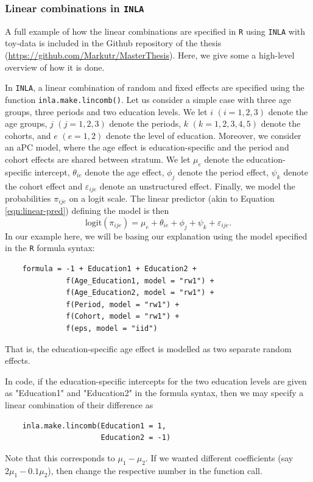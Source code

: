 \FloatBarrier
\subsubsection{Linear combinations in \texttt{INLA}}
\label{appendix:implementation:lincombs}
A full example of how the linear combinations are specified in \texttt{R} using \texttt{INLA} with toy-data is included in the Github repository of the thesis (\url{https://github.com/Markutr/MasterThesis}). Here, we give some a high-level overview of how it is done.

In \texttt{INLA}, a linear combination of random and fixed effects are specified using the function \texttt{inla.make.lincomb()}. Let us consider a simple case with three age groups, three periods and two education levels. We let $i$ $(i= 1,2,3)$ denote the age groups, $j$ $(j= 1,2,3)$ denote the periods, $k$ $(k= 1,2,3,4,5)$ denote the cohorts, and $e$ $(e= 1,2)$ denote the level of education. Moreover, we consider an aPC model, where the age effect is education-specific and the period and cohort effects are shared between stratum. We let $\mu_e$ denote the education-specific intercept, $\theta_{ie}$ denote the age effect, $\phi_j$ denote the period effect, $\psi_k$ denote the cohort effect and $\varepsilon_{ije}$ denote an unstructured effect. Finally, we model the probabilities $\pi_{ije}$ on a logit scale. The linear predictor (akin to Equation \eqref{eqn:linear-pred}) defining the model is then
\begin{equation}
    \text{logit}(\pi_{ije}) = \mu_e + \theta_{ie} + \phi_j + \psi_k + \varepsilon_{ije}.
\end{equation}
In our example here, we will be basing our explanation using the model specified in the \texttt{R} formula syntax:
\begin{lstlisting}
    formula = -1 + Education1 + Education2 + 
              f(Age_Education1, model = "rw1") + 
              f(Age_Education2, model = "rw1") +
              f(Period, model = "rw1") +
              f(Cohort, model = "rw1") +
              f(eps, model = "iid")
\end{lstlisting}
That is, the education-specific age effect is modelled as two separate random effects. 

In code, if the education-specific intercepts for the two education levels are given as "Education1" and "Education2" in the formula syntax, then we may specify a linear combination of their difference as
\begin{lstlisting}
    inla.make.lincomb(Education1 = 1, 
                      Education2 = -1)
\end{lstlisting}
Note that this corresponds to $\mu_1 - \mu_2$. If we wanted different coefficients (say $2\mu_1 - 0.1\mu_2$), then change the respective number in the function call. 

